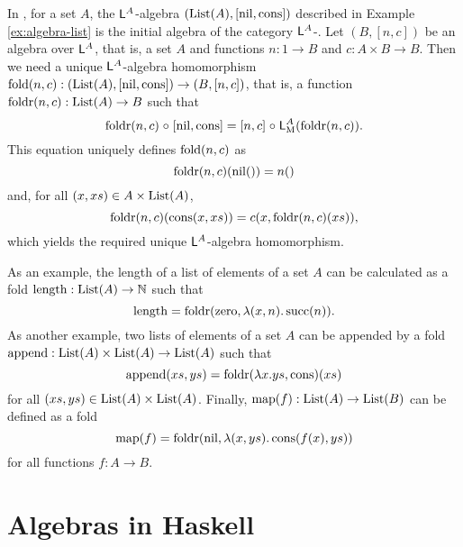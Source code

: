 \begin{example}
  \label{ex:initial-algebra-list}


  In \set, for a set $A$, the $\mathsf{L}^{A}$-algebra
  $(\text{List}(A),[\operatorname{nil},\operatorname{cons}])$ described in Example
  \ref{ex:algebra-list} is the initial algebra of the category
  $\mathsf{L}^{A}$-\alg. Let $(B,[n,c])$ be an algebra over
  $\mathsf{L}^{A}$, that is, a set $A$ and functions $n: 1 \to B$ and
  $c: A \times B \to B$. Then we need a unique $\mathsf{L}^{A}$-algebra
  homomorphism $\operatorname{fold}(n,c): (\text{List}(A),[\operatorname{nil},\operatorname{cons}]) \to (B,[n,c])$,
  that is, a function $\operatorname{foldr}(n,c): \text{List}(A) \to B$ such that
  \begin{equation*}
    \operatorname{foldr}(n,c) \mathrel{\circ} [\operatorname{nil},\operatorname{cons}] = [n,c] \mathrel{\circ} \mathsf{L}_{\operatorname{M}}^{A}(\operatorname{foldr}(n,c))
    \text{.}
  \end{equation*}
  This equation uniquely defines $\operatorname{fold}(n,c)$ as
  \begin{equation*}
    \operatorname{foldr}(n,c)(\operatorname{nil}()) = n()
  \end{equation*}
  and, for all $(x,xs) \in A \times \text{List}(A)$,
  \begin{equation*}
    \operatorname{foldr}(n,c)(\operatorname{cons}(x,xs)) = c(x,\operatorname{foldr}(n,c)(xs))
    \text{,}
  \end{equation*}
  which yields the required unique $\mathsf{L}^{A}$-algebra
  homomorphism.

  As an example, the length of a list of elements of a set $A$ can be
  calculated as a fold $\operatorname{length}: \text{List}(A) \to \mathbb{N}$ such that
  \begin{equation*}
    \operatorname{length} = \operatorname{foldr}(\operatorname{zero},\lambda(x,n).\operatorname{succ}(n))
    \text{.}
  \end{equation*}
  As another example, two lists of elements of a set $A$ can be
  appended by a fold $\operatorname{append}: \text{List}(A) \times \text{List}(A) \to
  \text{List}(A)$ such that
  \begin{equation*}
    \operatorname{append}(xs,ys) = \operatorname{foldr}(\lambda x.ys,\operatorname{cons})(xs)
  \end{equation*}
  for all $(xs,ys) \in \text{List}(A) \times \text{List}(A)$. Finally,
  $\operatorname{map}(f): \text{List}(A) \to \text{List}(B)$ can be defined as a fold
  \begin{equation*}
    \operatorname{map}(f) = \operatorname{foldr}(\operatorname{nil},\lambda(x,ys).\operatorname{cons}(f(x),ys))
  \end{equation*}
  for all functions $f: A \to B$.

\end{example}

\section{Algebras in Haskell}
\label{sec:algebras-haskell}

